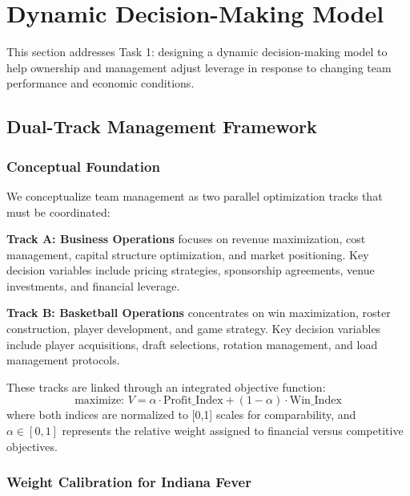 \documentclass{mcmthesis}
\begin{document}


\section{Dynamic Decision-Making Model}

This section addresses Task 1: designing a dynamic decision-making model to help ownership and management adjust leverage in response to changing team performance and economic conditions.

\subsection{Dual-Track Management Framework}

\subsubsection{Conceptual Foundation}

We conceptualize team management as two parallel optimization tracks that must be coordinated:

\textbf{Track A: Business Operations} focuses on revenue maximization, cost management, capital structure optimization, and market positioning. Key decision variables include pricing strategies, sponsorship agreements, venue investments, and financial leverage.

\textbf{Track B: Basketball Operations} concentrates on win maximization, roster construction, player development, and game strategy. Key decision variables include player acquisitions, draft selections, rotation management, and load management protocols.

These tracks are linked through an integrated objective function:
\begin{equation}
\text{maximize: } V = \alpha \cdot \text{Profit\_Index} + (1-\alpha) \cdot \text{Win\_Index}
\end{equation}
where both indices are normalized to [0,1] scales for comparability, and $\alpha \in [0,1]$ represents the relative weight assigned to financial versus competitive objectives.

\subsubsection{Weight Calibration for Indiana Fever}
\end{document}
